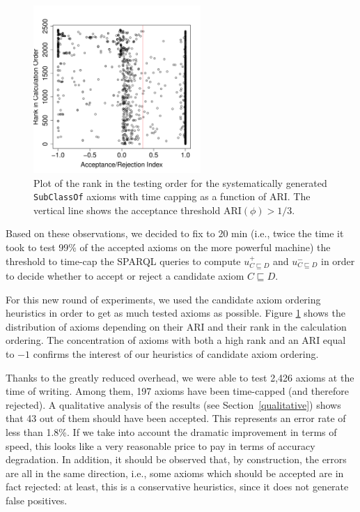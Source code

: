 \documentclass{llncs}
\begin{document}
\begin{figure}[t]
\begin{center}
  \includegraphics[height=2.5in]{rank-ARI-20}
\end{center}
\caption{Plot of the rank in the testing order for the systematically generated
 \texttt{SubClassOf} axioms with time capping as a function of ARI.
  The vertical line shows the acceptance threshold $\mathrm{ARI}(\phi)>1/3$.}
\label{fig:rank-ARI}
\end{figure}

Based on these observations, we decided to fix to 20 min
(i.e., twice the time it took to test 99\% of the accepted axioms on the more powerful machine)
the threshold to time-cap the SPARQL queries to compute $u^+_{C \sqsubseteq D}$ and $u^-_{C \sqsubseteq D}$
in order to decide whether to accept or reject a candidate axiom $C \sqsubseteq D$.

For this new round of experiments, we used the candidate axiom ordering heuristics
in order to get as much tested axioms as possible.
Figure \ref{fig:rank-ARI} shows the distribution of axioms depending on their ARI
and their rank in the calculation ordering. The concentration of axioms with both a high rank and an ARI equal to $-1$ confirms the interest of our heuristics of candidate axiom ordering.


Thanks to the greatly reduced overhead,
we were able to test 2,426 axioms at the time of writing. 
Among them, 197 axioms have been time-capped (and therefore rejected).
A qualitative analysis of the results (see Section~\ref{qualitative}) shows that
43 out of them should have been accepted.
This represents an error rate of less than 1.8\%. If we take into account the dramatic
improvement in terms of speed, this looks like a very reasonable price to pay
in terms of accuracy degradation. In addition, it should be observed that,
by construction, the errors are all in the same direction, i.e., some axioms
which should be accepted are in fact rejected: at least, this is a conservative
heuristics, since it does not generate false positives.
\end{document}
